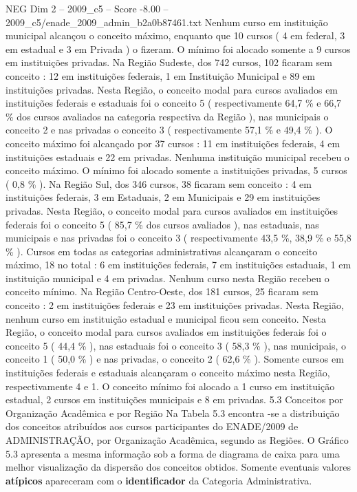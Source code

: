\begin{textsample}{NEG Dim 2 – 2009\_c5 – Score -8.00 – 2009\_c5/enade\_2009\_admin\_b2a0b87461.txt}
Nenhum curso em instituição municipal alcançou o conceito máximo, enquanto que 10 cursos ( 4 em federal, 3 em estadual e 3 em Privada ) o fizeram.
O mínimo foi alocado somente a 9 cursos em instituições privadas.
Na Região Sudeste, dos 742 cursos, 102 ficaram sem conceito : 12 em instituições federais, 1 em Instituição Municipal e 89 em instituições privadas.
Nesta Região, o conceito modal para cursos avaliados em instituições federais e estaduais foi o conceito 5 ( respectivamente 64,7 \% e 66,7 \% dos cursos avaliados na categoria respectiva da Região ), nas municipais o conceito 2 e nas privadas o conceito 3 ( respectivamente 57,1 \% e 49,4 \% ).
O conceito máximo foi alcançado por 37 cursos : 11 em instituições federais, 4 em instituições estaduais e 22 em privadas.
Nenhuma instituição municipal recebeu o conceito máximo.
O mínimo foi alocado somente a instituições privadas, 5 cursos ( 0,8 \% ).
Na Região Sul, dos 346 cursos, 38 ficaram sem conceito : 4 em instituições federais, 3 em Estaduais, 2 em Municipais e 29 em instituições privadas.
Nesta Região, o conceito modal para cursos avaliados em instituições federais foi o conceito 5 ( 85,7 \% dos cursos avaliados ), nas estaduais, nas municipais e nas privadas foi o conceito 3 ( respectivamente 43,5 \%, 38,9 \% e 55,8 \% ).
Cursos em todas as categorias administrativas alcançaram o conceito máximo, 18 no total : 6 em instituições federais, 7 em instituições estaduais, 1 em instituição municipal e 4 em privadas.
Nenhum curso nesta Região recebeu o conceito mínimo.
Na Região Centro-Oeste, dos 181 cursos, 25 ficaram sem conceito : 2 em instituições federais e 23 em instituições privadas.
Nesta Região, nenhum curso em instituição estadual e municipal ficou sem conceito.
Nesta Região, o conceito modal para cursos avaliados em instituições federais foi o conceito 5 ( 44,4 \% ), nas estaduais foi o conceito 3 ( 58,3 \% ), nas municipais, o conceito 1 ( 50,0 \% ) e nas privadas, o conceito 2 ( 62,6 \% ).
Somente cursos em instituições federais e estaduais alcançaram o conceito máximo nesta Região, respectivamente 4 e 1.
O conceito mínimo foi alocado a 1 curso em instituição estadual, 2 cursos em instituições municipais e 8 em privadas. 5.3 Conceitos por Organização Acadêmica e por Região Na Tabela 5.3 encontra -se a distribuição dos conceitos atribuídos aos cursos participantes do ENADE/2009 de ADMINISTRAÇÃO, por Organização Acadêmica, segundo as Regiões.
O Gráfico 5.3 apresenta a mesma informação sob a forma de diagrama de caixa para uma melhor visualização da dispersão dos conceitos obtidos.
Somente eventuais valores \textbf{atípicos} apareceram com o \textbf{identificador} da Categoria Administrativa.

\end{textsample}
